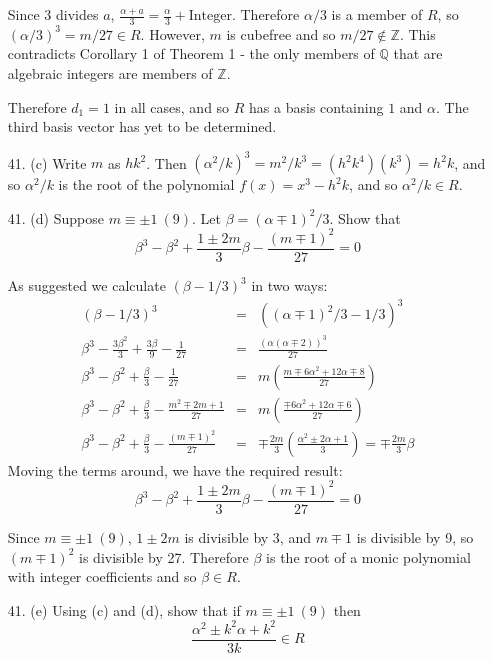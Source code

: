 \documentclass{article}
\newcommand{\Q}[0]{\mathbb{Q}}
\newcommand{\Z}[0]{\mathbb{Z}}
\begin{document}
\begin{enumerate}
Since 3 divides $a$, $\frac{\alpha + a}{3} = \frac{\alpha}{3} + \text{Integer}$.  Therefore $\alpha/3$ is a member of $R$, so $(\alpha / 3)^3 = m / 27 \in R$.  However, $m$ is cubefree and so $m / 27 \not \in \Z$.  This contradicts Corollary 1 of Theorem 1 - the only members of $\Q$ that are algebraic integers are members of $\Z$.

Therefore $d_1 = 1$ in all cases, and so $R$ has a basis containing $1$ and $\alpha$.  The third basis vector has yet to be determined.

\item[41. (c)] Write $m$ as $hk^2$.  Then $(\alpha^2 / k)^3 = m^2 / k^3 = (h^2 k^4)(k^3) = h^2 k$, and so $\alpha^2 / k$ is the root of the polynomial $f(x) = x^3 - h^2k$, and so $\alpha^2 / k \in R$.

\item[41. (d)] Suppose $m \equiv \pm 1\ (9)$.  Let $\beta = (\alpha \mp 1)^2 / 3$.  Show that
\[ \beta^3 - \beta^2 + \frac{1 \pm 2m}{3} \beta - \frac{(m \mp 1)^2}{27} = 0 \]

As suggested we calculate $(\beta - 1/3)^3$ in two ways:
\begin{eqnarray*}
(\beta - 1/3)^3 &=& ((\alpha \mp 1)^2 / 3 - 1/3)^3 \\
\beta^3 - \frac{3\beta^2}{3} + \frac{3\beta}{9} - \frac{1}{27} &=& \frac{(\alpha(\alpha \mp 2))^3}{27} \\
\beta^3 - \beta^2 + \frac{\beta}{3} - \frac{1}{27} &=& m\left(\frac{m \mp 6\alpha^2 + 12\alpha \mp 8}{27}\right)\\
\beta^3 - \beta^2 + \frac{\beta}{3} - \frac{m^2 \mp 2m + 1}{27} &=& m\left( \frac{\mp 6\alpha^2 + 12\alpha \mp 6}{27}\right)\\
\beta^3 - \beta^2 + \frac{\beta}{3} - \frac{(m \mp 1)^2}{27} &=& \mp \frac{2m}{3}\left( \frac{\alpha^2 \pm 2\alpha + 1}{3}\right) = \mp \frac{2m}{3}\beta
\end{eqnarray*}
Moving the terms around, we have the required result:
\[ \beta^3 - \beta^2 + \frac{1 \pm 2m}{3}\beta - \frac{(m \mp 1)^2}{27} = 0 \]

Since $m \equiv \pm 1\ (9)$, $1 \pm 2m$ is divisible by 3, and $m \mp 1$ is divisible by 9, so $(m \mp 1)^2$ is divisible by 27.  Therefore $\beta$ is the root of a monic polynomial with integer coefficients and so $\beta \in R$.

\item[41. (e)] Using (c) and (d), show that if $m \equiv \pm 1\ (9)$ then
\[ \frac{\alpha^2 \pm k^2 \alpha + k^2}{3k} \in R \]


\end{enumerate}
\end{document}
